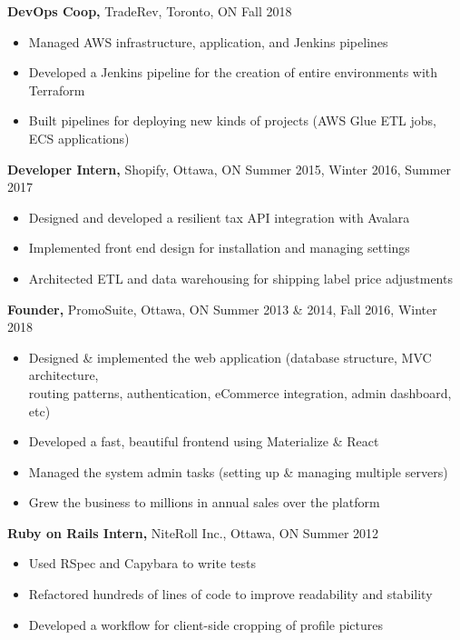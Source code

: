 \documentclass[line, centered]{res}
\begin{document}
\begin{resume}
 {\bf DevOps Coop,} TradeRev, Toronto, ON \hfill Fall 2018\\[-8pt]
 \begin{itemize} \itemsep -2pt  %
    \item Managed AWS infrastructure, application, and Jenkins pipelines
    \item Developed a Jenkins pipeline for the creation of entire environments with Terraform
    \item Built pipelines for deploying new kinds of projects (AWS Glue ETL jobs, ECS applications)
 \end{itemize}

 {\bf Developer Intern,} Shopify, Ottawa, ON \hfill Summer 2015, Winter 2016, Summer 2017\\[-8pt]
 \begin{itemize} \itemsep -2pt  %
    \item Designed and developed a resilient tax API integration with Avalara
    \item Implemented front end design for installation and managing settings
    \item Architected ETL and data warehousing for shipping label price adjustments
 \end{itemize}

 {\bf Founder,} PromoSuite, Ottawa, ON \hfill Summer 2013 \& 2014, Fall 2016, Winter 2018\\[-8pt]
 \begin{itemize} \itemsep -2pt  %
    \item Designed \& implemented the web application (database structure, MVC architecture,\\
            routing patterns, authentication, eCommerce integration, admin dashboard, etc)
    \item Developed a fast, beautiful frontend using Materialize \& React
    \item Managed the system admin tasks (setting up \& managing multiple servers)
    \item Grew the business to millions in annual sales over the platform
 \end{itemize}


{\bf Ruby on Rails Intern,} NiteRoll Inc., Ottawa, ON \hfill Summer 2012
\begin{itemize} \itemsep -2pt
	\item Used RSpec and Capybara to write tests
    \item Refactored hundreds of lines of code to improve readability and stability
    \item Developed a workflow for client-side cropping of profile pictures
\end{itemize}



\end{resume}
\end{document}
